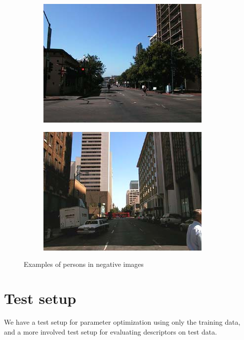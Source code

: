 \documentclass[thesis.tex]{subfiles}
\begin{document}
\begin{figure}[tb]
	\begin{subfigure}[t]{0.5\textwidth}
		\includegraphics[width=\textwidth]{img/inriaManExample1.png}
	\end{subfigure}
	\begin{subfigure}[t]{0.5\textwidth}
		\includegraphics[width=\textwidth]{img/inriaManOccluded.png}
	\end{subfigure}
	\caption{Examples of persons in negative images}
	\label{fig:inriaNegativePersons}
\end{figure}

\section{Test setup}
%
We have a test setup for parameter optimization using only the training data, and a more involved test setup for evaluating descriptors on test data.
\end{document}
